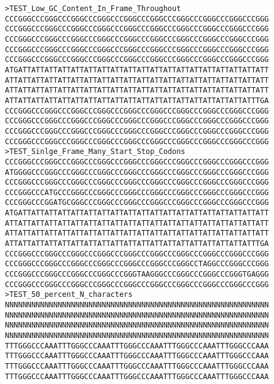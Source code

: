 \begin{verbatim}
>TEST_Low_GC_Content_In_Frame_Throughout
CCCGGGCCCGGGCCCGGGCCCGGGCCCGGGCCCGGGCCCGGGCCCGGGCCCGGGCCCGGG
CCCGGGCCCGGGCCCGGGCCCGGGCCCGGGCCCGGGCCCGGGCCCGGGCCCGGGCCCGGG
CCCGGGCCCGGGCCCGGGCCCGGGCCCGGGCCCGGGCCCGGGCCCGGGCCCGGGCCCGGG
CCCGGGCCCGGGCCCGGGCCCGGGCCCGGGCCCGGGCCCGGGCCCGGGCCCGGGCCCGGG
CCCGGGCCCGGGCCCGGGCCCGGGCCCGGGCCCGGGCCCGGGCCCGGGCCCGGGCCCGGG
ATGATTATTATTATTATTATTATTATTATTATTATTATTATTATTATTATTATTATTATT
ATTATTATTATTATTATTATTATTATTATTATTATTATTATTATTATTATTATTATTATT
ATTATTATTATTATTATTATTATTATTATTATTATTATTATTATTATTATTATTATTATT
ATTATTATTATTATTATTATTATTATTATTATTATTATTATTATTATTATTATTATTTGA
CCCGGGCCCGGGCCCGGGCCCGGGCCCGGGCCCGGGCCCGGGCCCGGGCCCGGGCCCGGG
CCCGGGCCCGGGCCCGGGCCCGGGCCCGGGCCCGGGCCCGGGCCCGGGCCCGGGCCCGGG
CCCGGGCCCGGGCCCGGGCCCGGGCCCGGGCCCGGGCCCGGGCCCGGGCCCGGGCCCGGG
CCCGGGCCCGGGCCCGGGCCCGGGCCCGGGCCCGGGCCCGGGCCCGGGCCCGGGCCCGGG
>TEST_Sinlge_Frame_Many_Start_Stop_Codons
CCCGGGCCCGGGCCCGGGCCCGGGCCCGGGCCCGGGCCCGGGCCCGGGCCCGGGCCCGGG
ATGGGGCCCGGGCCCGGGCCCGGGCCCGGGCCCGGGCCCGGGCCCGGGCCCGGGCCCGGG
CCCGGGCCCGGGCCCGGGCCCGGGCCCGGGCCCGGGCCCGGGCCCGGGCCCGGGCCCGGG
CCCGGGCCCATGCCCGGGCCCGGGCCCGGGCCCGGGCCCGGGCCCGGGCCCGGGCCCGGG
CCCGGGCCCGGATGCGGGCCCGGGCCCGGGCCCGGGCCCGGGCCCGGGCCCGGGCCCGGG
ATGATTATTATTATTATTATTATTATTATTATTATTATTATTATTATTATTATTATTATT
ATTATTATTATTATTATTATTATTATTATTATTATTATTATTATTATTATTATTATTATT
ATTATTATTATTATTATTATTATTATTATTATTATTATTATTATTATTATTATTATTATT
ATTATTATTATTATTATTATTATTATTATTATTATTATTATTATTATTATTATTATTTGA
CCCGGGCCCGGGCCCGGGCCCGGGCCCGGGCCCGGGCCCGGGCCCGGGCCCGGGCCCGGG
CCCGGGCCCGGGCCCGGGCCCGGGCCCGGGCCCGGGCCCGGGCCTAGGCCCGGGCCCGGG
CCCGGGCCCGGGCCCGGGCCCGGGCCCGGGTAAGGGCCCGGGCCCGGGCCCGGGTGAGGG
CCCGGGCCCGGGCCCGGGCCCGGGCCCGGGCCCGGGCCCGGGCCCGGGCCCGGGCCCGGG
>TEST_50_percent_N_characters
NNNNNNNNNNNNNNNNNNNNNNNNNNNNNNNNNNNNNNNNNNNNNNNNNNNNNNNNNNNN
NNNNNNNNNNNNNNNNNNNNNNNNNNNNNNNNNNNNNNNNNNNNNNNNNNNNNNNNNNNN
NNNNNNNNNNNNNNNNNNNNNNNNNNNNNNNNNNNNNNNNNNNNNNNNNNNNNNNNNNNN
NNNNNNNNNNNNNNNNNNNNNNNNNNNNNNNNNNNNNNNNNNNNNNNNNNNNNNNNNNNN
TTTGGGCCCAAATTTGGGCCCAAATTTGGGCCCAAATTTGGGCCCAAATTTGGGCCCAAA
TTTGGGCCCAAATTTGGGCCCAAATTTGGGCCCAAATTTGGGCCCAAATTTGGGCCCAAA
TTTGGGCCCAAATTTGGGCCCAAATTTGGGCCCAAATTTGGGCCCAAATTTGGGCCCAAA
TTTGGGCCCAAATTTGGGCCCAAATTTGGGCCCAAATTTGGGCCCAAATTTGGGCCCAAA
\end{verbatim}